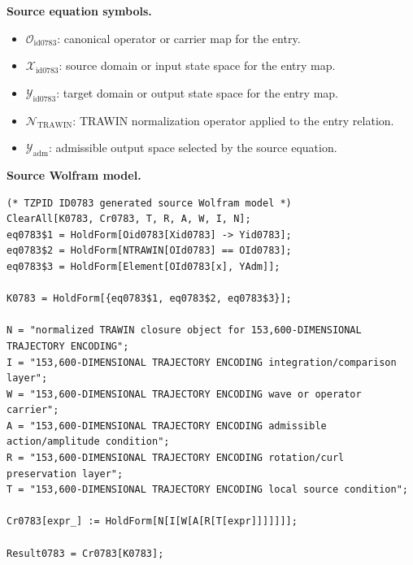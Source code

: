 \begin{minipage}[t]{0.49\linewidth}
\begingroup
\small
\raggedright
\textbf{Source equation symbols.}\par
\begin{itemize}[leftmargin=1.35em,itemsep=1pt,topsep=1pt,parsep=0pt]
    \item $\mathcal{O}_{\mathrm{id0783}}$: canonical operator or carrier map for the entry.
    \item $\mathcal{X}_{\mathrm{id0783}}$: source domain or input state space for the entry map.
    \item $\mathcal{Y}_{\mathrm{id0783}}$: target domain or output state space for the entry map.
    \item $\mathcal{N}_{\mathrm{TRAWIN}}$: TRAWIN normalization operator applied to the entry relation.
    \item $\mathcal{Y}_{\mathrm{adm}}$: admissible output space selected by the source equation.
\end{itemize}
\endgroup
\end{minipage}\hfill
\begin{minipage}[t]{0.47\linewidth}
\begingroup
\scriptsize
\raggedright
\textbf{Source Wolfram model.}\par
\begin{Verbatim}[fontsize=\tiny,breaklines=true,breakanywhere=true]
(* TZPID ID0783 generated source Wolfram model *)
ClearAll[K0783, Cr0783, T, R, A, W, I, N];
eq0783$1 = HoldForm[Oid0783[Xid0783] -> Yid0783];
eq0783$2 = HoldForm[NTRAWIN[OId0783] == OId0783];
eq0783$3 = HoldForm[Element[OId0783[x], YAdm]];

K0783 = HoldForm[{eq0783$1, eq0783$2, eq0783$3}];

N = "normalized TRAWIN closure object for 153,600-DIMENSIONAL TRAJECTORY ENCODING";
I = "153,600-DIMENSIONAL TRAJECTORY ENCODING integration/comparison layer";
W = "153,600-DIMENSIONAL TRAJECTORY ENCODING wave or operator carrier";
A = "153,600-DIMENSIONAL TRAJECTORY ENCODING admissible action/amplitude condition";
R = "153,600-DIMENSIONAL TRAJECTORY ENCODING rotation/curl preservation layer";
T = "153,600-DIMENSIONAL TRAJECTORY ENCODING local source condition";

Cr0783[expr_] := HoldForm[N[I[W[A[R[T[expr]]]]]]];

Result0783 = Cr0783[K0783];
\end{Verbatim}
\endgroup
\end{minipage}

